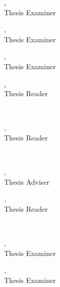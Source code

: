 \documentclass[a4paper, 12pt]{report}
\newif\ifexaminer     \examinertrue
\newif\ifexaminertwo  \examinertwofalse
\begin{document}
        \noindent\begin{minipage}{.5\textwidth}
    	\centering
    	\underline{\MakeUppercase{\examiner}, \examinerdegree}\\
    	Thesis Examiner
    \end{minipage}%
    \begin{minipage}{.5\textwidth}
    	\centering
    	\underline{\MakeUppercase{\examinertwo}, \examinertwodegree}\\
    	Thesis Examiner
    \end{minipage}
   \else
    \noindent\begin{minipage}{.5\textwidth}
    	\centering
    	\underline{\MakeUppercase{\examiner}, \examinerdegree}\\
    	Thesis Examiner
    \end{minipage}%
    \begin{minipage}{0.5\textwidth}
    	\centering
    	\underline{\MakeUppercase{\reader}, \readerdegree}\\
    	Thesis Reader
    \end{minipage}\\\fi
    \else
    \noindent\begin{minipage}{\textwidth}
            \centering
            \underline{\MakeUppercase{\reader}, \readerdegree}\\
            Thesis Reader
    \end{minipage}\\
    \fi
\else 
    \ifexaminer
    \ifexaminertwo
    \noindent \begin{minipage}{.5\textwidth}
    	\centering
    	\underline{\MakeUppercase{\adviserone}, \adviseronedegree}\\
    	Thesis Adviser
    \end{minipage}%
    \begin{minipage}{.5\textwidth}
    	\centering
    	\underline{\MakeUppercase{\reader}, \readerdegree}\\
            Thesis Reader
    \end{minipage}\\

    \vspace{1cm}

    \noindent\begin{minipage}{.5\textwidth}
    	\centering
    	\underline{\MakeUppercase{\examiner}, \examinerdegree}\\
    	Thesis Examiner
    \end{minipage}%
    \begin{minipage}{.5\textwidth}
    	\centering
    	\underline{\MakeUppercase{\examinertwo}, \examinertwodegree}\\
    	Thesis Examiner
    \end{minipage}
    
\end{document}
